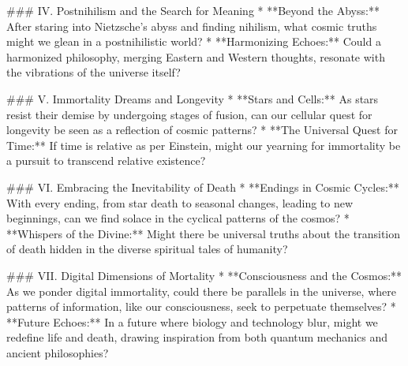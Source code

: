 ### IV. Postnihilism and the Search for Meaning
   * **Beyond the Abyss:** After staring into Nietzsche's abyss and finding nihilism, what cosmic truths might we glean in a postnihilistic world?
   * **Harmonizing Echoes:** Could a harmonized philosophy, merging Eastern and Western thoughts, resonate with the vibrations of the universe itself?

### V. Immortality Dreams and Longevity
   * **Stars and Cells:** As stars resist their demise by undergoing stages of fusion, can our cellular quest for longevity be seen as a reflection of cosmic patterns?
   * **The Universal Quest for Time:** If time is relative as per Einstein, might our yearning for immortality be a pursuit to transcend relative existence?

### VI. Embracing the Inevitability of Death
   * **Endings in Cosmic Cycles:** With every ending, from star death to seasonal changes, leading to new beginnings, can we find solace in the cyclical patterns of the cosmos?
   * **Whispers of the Divine:** Might there be universal truths about the transition of death hidden in the diverse spiritual tales of humanity?

### VII. Digital Dimensions of Mortality
   * **Consciousness and the Cosmos:** As we ponder digital immortality, could there be parallels in the universe, where patterns of information, like our consciousness, seek to perpetuate themselves?
   * **Future Echoes:** In a future where biology and technology blur, might we redefine life and death, drawing inspiration from both quantum mechanics and ancient philosophies?
